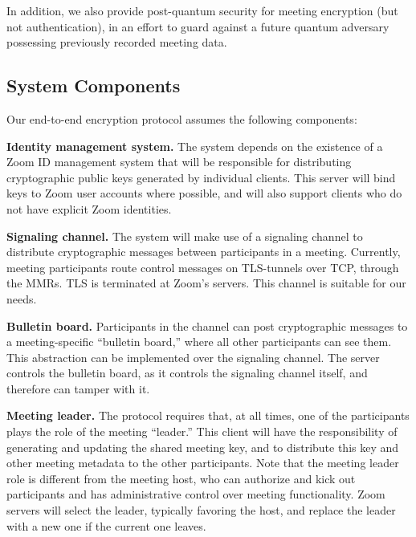 In addition, we also provide post-quantum security for meeting encryption (but not authentication),
in an effort to guard against a future quantum adversary possessing previously recorded meeting
data.

\subsection{System Components}
\label{subsec:comp}

Our end-to-end encryption protocol assumes the following components:
\begin{description}
\item {\bf Identity management system.} The system depends on the existence of a Zoom ID management
system that will be responsible for distributing cryptographic public keys generated by individual
clients. This server will bind keys to Zoom user accounts where possible, and will also support
clients who do not have explicit Zoom identities.

\item {\bf Signaling channel.} The system will make use of a signaling channel to distribute
cryptographic messages between participants in a meeting. Currently, meeting participants route
control messages on TLS-tunnels over TCP, through the MMRs. TLS is terminated at Zoom's servers.
This channel is suitable for our needs.

\item {\bf Bulletin board.} Participants in the channel can post cryptographic messages to a
meeting-specific ``bulletin board,'' where all other participants can see them. This abstraction can
be implemented over the signaling channel. The server controls the bulletin board, as it controls
the signaling channel itself, and therefore can tamper with it.

\item {\bf Meeting leader.} The protocol requires that, at all times, one of the participants plays
the role of the meeting ``leader.'' This client will have the responsibility of generating and
updating the shared meeting key, and to distribute this key and other meeting metadata to the other
participants. Note that the meeting leader role is different from the meeting host, who can
authorize and kick out participants and has administrative control over meeting functionality. Zoom
servers will select the leader, typically favoring the host,
and replace the leader with a new one if the current one leaves. 

\end{description}

